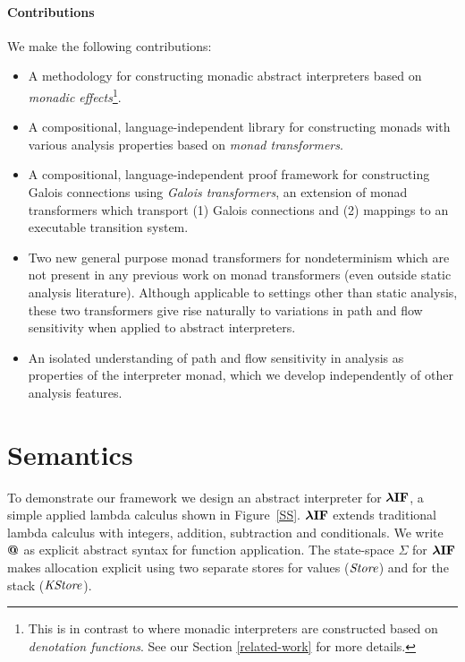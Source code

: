 \par

\paragraph{Contributions}

We make the following contributions:

\par

\begin{itemize}
\itemsep1pt\parskip0pt
\item
  A methodology for constructing monadic abstract interpreters based on
  \emph{monadic effects}\footnote{
  This is in contrast to \citet{dvanhorn:Sergey2013Monadic} where monadic
  interpreters are constructed based on \emph{denotation functions}. See our
  Section \ref{related-work} for more details.}.
\item
  A compositional, language-independent library for constructing monads
  with various analysis properties based on \emph{monad transformers}.
\item
  A compositional, language-independent proof framework for constructing
  Galois connections using \emph{Galois transformers}, an extension of
  monad transformers which transport (1) Galois connections and (2)
  mappings to an executable transition system.
\item
  Two new general purpose monad transformers for nondeterminism which
  are not present in any previous work on monad transformers (even
  outside static analysis literature). Although applicable to settings
  other than static analysis, these two transformers give rise naturally
  to variations in path and flow sensitivity when applied to abstract
  interpreters.
\item
  An isolated understanding of path and flow sensitivity in analysis as
  properties of the interpreter monad, which we develop independently of
  other analysis features.
\end{itemize}

\par

\section{Semantics}\label{semantics}

\par

To demonstrate our framework we design an abstract interpreter for
$ \operatorname{\mathtt{\boldsymbol{\mathbf{\lambda{}IF}}}} $, a simple applied lambda calculus shown in
Figure~\ref{SS}. $ \operatorname{\mathtt{\boldsymbol{\mathbf{\lambda{}IF}}}} $ extends traditional lambda
calculus with integers, addition, subtraction and conditionals. We write
$ \mathbin{\mathtt{\mathbf{\boldsymbol{ \mathbin{\bm{@}} }}}} $ as explicit abstract syntax for
function application. The state-space $ \Sigma $ for
$ \operatorname{\mathtt{\boldsymbol{\mathbf{\lambda{}IF}}}} $ makes allocation explicit using two separate
stores for values ($ \operatorname{\mathit{Store}} $) and for the stack
($ \operatorname{\mathit{KStore}} $).


